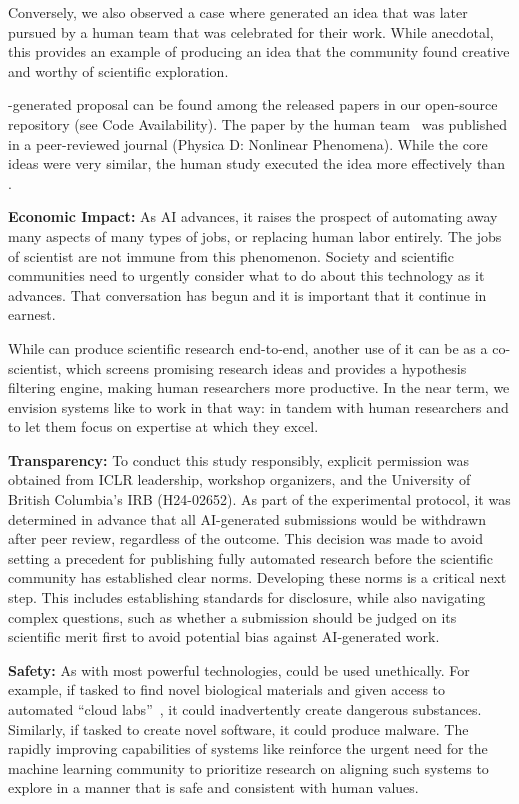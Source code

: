 \begin{appendices}
Conversely, we also observed a case where \ouralgo generated an idea that was later pursued by a human team that was celebrated for their work. While anecdotal, this provides an example of \ouralgo producing an idea that the community found creative and worthy of scientific exploration.

\ouralgo-generated proposal can be found among the released papers in our open-source repository (see Code Availability). The paper by the human team~\citep{DEMOSS2025134859} was published in a peer-reviewed journal (Physica D: Nonlinear Phenomena). While the core ideas were very similar, the human study executed the idea more effectively than \ouralgo.

\textbf{Economic Impact:}
As AI advances, it raises the prospect of automating away many aspects of many types of jobs, or replacing human labor entirely. The jobs of scientist are not immune from this phenomenon. Society and scientific communities need to urgently consider what to do about this technology as it advances. That conversation has begun and it is important that it continue in earnest.

While \ouralgo can produce scientific research end-to-end, another use of it can be as a co-scientist, which screens promising research ideas and provides a hypothesis filtering engine, making human researchers more productive. In the near term, we envision systems like \ouralgo to work in that way: in tandem with human researchers and to let them focus on expertise at which they excel.

\textbf{Transparency:}
To conduct this study responsibly, explicit permission was obtained from ICLR leadership, workshop organizers, and the University of British Columbia's IRB (H24-02652). As part of the experimental protocol, it was determined in advance that all AI-generated submissions would be withdrawn after peer review, regardless of the outcome. This decision was made to avoid setting a precedent for publishing fully automated research before the scientific community has established clear norms. Developing these norms is a critical next step. This includes establishing standards for disclosure, while also navigating complex questions, such as whether a submission should be judged on its scientific merit first to avoid potential bias against AI-generated work.

\textbf{Safety:}
As with most powerful technologies, \ouralgo could be used unethically. For example, if tasked to find novel biological materials and given access to automated ``cloud labs''~\citep{arnold2022cloud}, it could inadvertently create dangerous substances. Similarly, if tasked to create novel software, it could produce malware. The rapidly improving capabilities of systems like \ouralgo reinforce the urgent need for the machine learning community to prioritize research on aligning such systems to explore in a manner that is safe and consistent with human values\citep{ecoffet2020open}.


\end{appendices}
